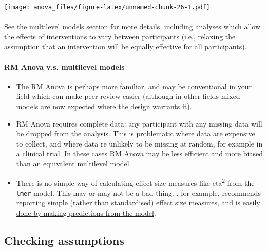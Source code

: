 \documentclass[]{article}
\let\oldparagraph\paragraph
\renewcommand{\paragraph}[1]{\oldparagraph{#1}\mbox{}}
\begin{document}
\texttt{[image: anova\_files/figure-latex/unnamed-chunk-26-1.pdf]}

\hypertarget{section-12}{%
\paragraph{}\label{section-12}}

See the \protect\hyperlink{multilevel-models}{multilevel models section} for more details,
including analyses which allow the effects of interventions to vary between
participants (i.e., relaxing the assumption that an intervention will be equally
effective for all participants).

\hypertarget{rm-anova-v.s.-multilevel-models}{%
\paragraph{RM Anova v.s. multilevel models}\label{rm-anova-v.s.-multilevel-models}}

\begin{itemize}
\item
  The RM Anova is perhaps more familiar, and may be conventional in your field
  which can make peer review easier (although in other fields mixed models are
  now expected where the design warrants it).
\item
  RM Anova requires complete data: any participant with any missing data will
  be dropped from the analysis. This is problematic where data are expensive
  to collect, and where data re unlikely to be missing at random, for example
  in a clinical trial. In these cases RM Anova may be less efficient and more
  biased than an equivalent multilevel model.
\item
  There is no simple way of calculating effect size measures like eta\textsuperscript{2} from
  the \texttt{lmer} model. This may or may not be a bad thing.
  \citet{baguley2009standardized}, for example, recommends reporting simple (rather
  than standardised) effect size measures, and is
  \protect\hyperlink{predictions-and-margins}{easily done by making predictions from the model}.
\end{itemize}

\hypertarget{checking-assumptions}{%
\subsection*{Checking assumptions}\label{checking-assumptions}}
\end{document}

